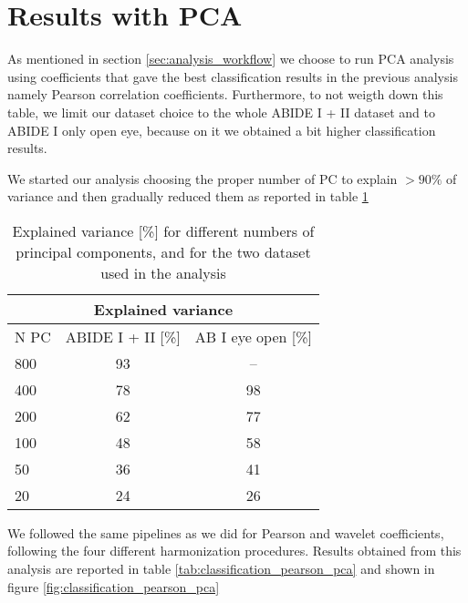 \documentclass[11pt]{report}
\begin{document}
\newpage

\section{Results with PCA}\label{sec:results_pca}

As mentioned in section \ref{sec:analysis_workflow} we choose to run PCA analysis using coefficients that gave the best classification results in the previous analysis namely Pearson correlation coefficients. Furthermore, to not weigth down this table, we limit our dataset choice to the whole ABIDE I + II dataset and to ABIDE I only open eye, because on it we obtained a bit higher classification results.

We started our analysis choosing the proper number of PC to explain $> 90\%$ of variance and then gradually reduced them as reported in table \ref{tab:pca_explained}

\begin{table}[h]
\centering
\begin{tabular}{ |l|c c| }
\hline
\multicolumn{3}{|c|}{Explained variance} \\
 \hline
  N PC & ABIDE I + II [\%] & AB I eye open [\%] \\
  \hline
 800 & 93 & -- \\
 400 & 78 & 98 \\
 200 & 62 & 77 \\
 100 &48 & 58 \\
 50 & 36 & 41 \\
 20 & 24 & 26\\
 \hline
\end{tabular}
\caption{Explained variance [\%] for different numbers of principal components, and for the two dataset used in the analysis}
\label{tab:pca_explained}
\end{table}


We followed the same pipelines as we did for Pearson and wavelet coefficients, following the four different harmonization procedures.
Results obtained from this analysis are reported in table \ref{tab:classification_pearson_pca} and shown in figure \ref{fig:classification_pearson_pca}
\end{document}
